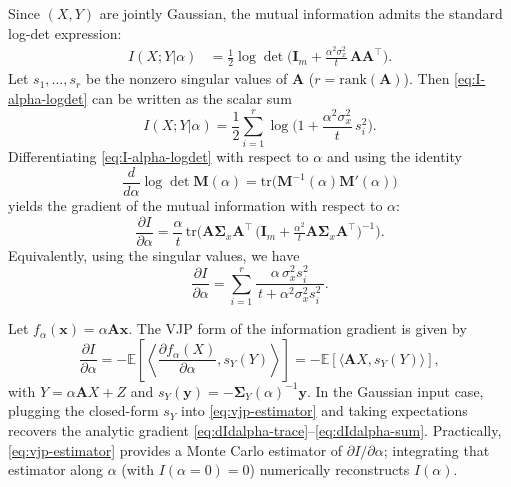 \documentclass[conference]{IEEEtran}
\begin{document}
Since $(X,Y)$ are jointly Gaussian, the mutual information admits the standard log-det expression:
\begin{align}
\label{eq:I-alpha-logdet}
I(X;Y|\alpha) 
&= \frac{1}{2}\log\det\!\Big(\bm I_m + \frac{\alpha^2 \sigma_x^2}{t}\, \bm A \bm A^\top\Big).
\end{align}
Let $s_1,\dots,s_r$ be the nonzero singular values of $\bm A$ ($r=\mathrm{rank}(\bm A)$). Then \eqref{eq:I-alpha-logdet} can be written as the scalar sum
\begin{equation}
\label{eq:I-alpha-sum}
I(X;Y|\alpha) = \frac{1}{2}\sum_{i=1}^{r} \log\!\Big(1+\frac{\alpha^2 \sigma_x^2}{t}\, s_i^2\Big).
\end{equation}
Differentiating \eqref{eq:I-alpha-logdet} with respect to $\alpha$ and using the identity
\begin{equation}
\frac{d}{d\alpha}\log\det \bm M(\alpha)=\mathrm{tr}\!\big(\bm M^{-1}(\alpha) \bm M'(\alpha)\big)
\end{equation}
yields the gradient of the mutual information with respect to $\alpha$:
\begin{equation}
\label{eq:dIdalpha-trace}
\frac{\partial I}{\partial \alpha} 
= \frac{\alpha}{t}\,\mathrm{tr}\!\Big( \bm A \bm \Sigma_x \bm A^\top \,\big(\bm I_m + \tfrac{\alpha^2}{t} \bm A \bm \Sigma_x \bm A^\top\big)^{-1} \Big).
\end{equation}
Equivalently, using the singular values, we have
\begin{equation}
\label{eq:dIdalpha-sum}
\frac{\partial I}{\partial \alpha}
= \sum_{i=1}^{r}
\frac{\alpha\, \sigma_x^2 s_i^2}{\,t + \alpha^2 \sigma_x^2 s_i^2\,}.
\end{equation}

Let $f_\alpha(\bm x)=\alpha \bm A \bm x$. The VJP form of the information gradient is given by
\begin{equation}
\label{eq:vjp-estimator}
\frac{\partial I}{\partial \alpha}
= -\mathbb{E}\!\left[\left\langle \frac{\partial f_\alpha(X)}
{\partial \alpha}, s_Y(Y)\right\rangle \right]
= -\mathbb{E}\!\left[\big\langle \bm A X, s_Y(Y)\big\rangle \right],
\end{equation}
with $Y=\alpha \bm A X + Z$ and $s_Y(\bm y)=-\bm \Sigma_Y(\alpha)^{-1} \bm y$. 
In the Gaussian input case, plugging the closed-form $s_Y$ into 
\eqref{eq:vjp-estimator} and taking expectations recovers the analytic gradient 
\eqref{eq:dIdalpha-trace}–\eqref{eq:dIdalpha-sum}.
Practically, \eqref{eq:vjp-estimator} provides 
a Monte Carlo estimator of $\partial I/\partial\alpha$; 
integrating that estimator along $\alpha$ (with $I(\alpha{=}0)=0$) 
numerically reconstructs $I(\alpha)$.
\end{document}
